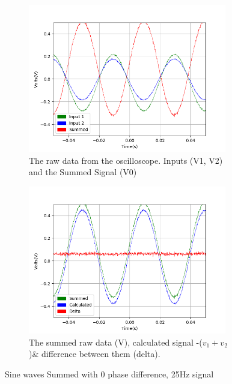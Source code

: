 \begin{figure}[h!]
\centering
\begin{subfigure}[t]{.475\textwidth}
  \centering
  \includegraphics[width=0.95\textwidth, height=0.20\textheight]{figures/Summing/scope_2raw.png}
  \caption{The raw data from the oscilloscope. Inputs (V1, V2) and the Summed Signal (V0)}
 \label{fig:sum_2_og_data}
\end{subfigure}\hfill
\begin{subfigure}[t]{.475\textwidth}
  \centering
  \includegraphics[width=0.95\textwidth, height=0.20\textheight]{figures/Summing/scope_2.png}
  \caption{The summed raw data (V), calculated signal -($v_1 + v_2$)\& difference between them (delta).}
\label{fig:sum_2_calc_data}
\end{subfigure}
\caption{Sine waves Summed with 0 phase difference, 25Hz signal}
\label{fig:sum_2}
\end{figure}

